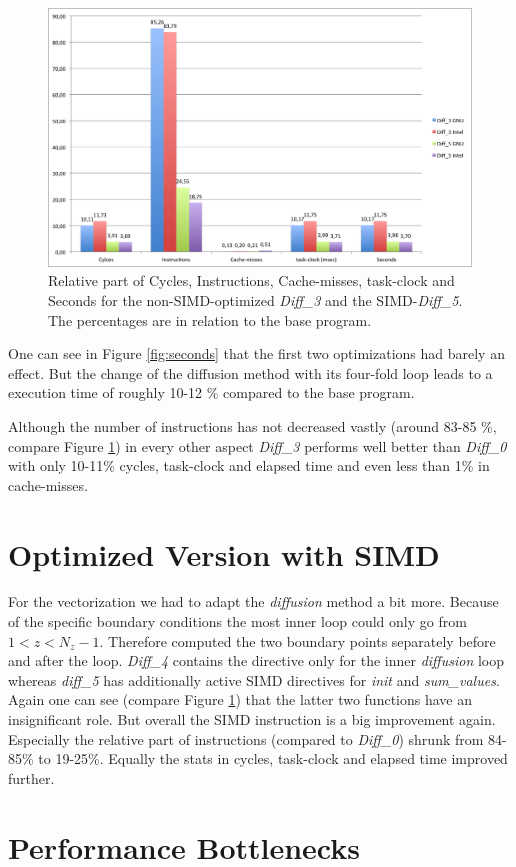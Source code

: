 \documentclass[12pt,a4paper]{article}
\begin{document}
\begin{figure}
	\centering
	\includegraphics[width=1.0\linewidth]{"Benchmark/percentage"}
	\caption{Relative part of Cycles, Instructions, Cache-misses, task-clock and Seconds for the non-SIMD-optimized \emph{Diff\_3} and the SIMD-\emph{Diff\_5}. The percentages are in relation to the base program.}
	\label{fig:percentage}
\end{figure}

One can see in Figure \ref{fig:seconds} that the first two optimizations had barely an effect. But the change of the diffusion method with its four-fold loop leads to a execution time of roughly 10-12 \% compared to the base program. 

Although the number of instructions has not decreased vastly (around 83-85 \%, compare Figure \ref{fig:percentage}) in every other aspect \emph{Diff\_3} performs well better than \emph{Diff\_0} with only 10-11\% cycles, task-clock and elapsed time and even less than 1\% in cache-misses. 

\section{Optimized Version with SIMD}

For the vectorization we had to adapt the \emph{diffusion} method a bit more. Because of the specific boundary conditions the most inner loop could only go from $ 1 < z < N_z - 1 $. Therefore computed the two boundary points separately before and after the loop. \emph{Diff\_4} contains the directive only for the inner \emph{diffusion} loop whereas \emph{diff\_5} has additionally active SIMD directives for \emph{init} and \emph{sum\_values}. Again one can see (compare Figure \ref{fig:percentage}) that the latter two functions have an insignificant role. But overall the SIMD instruction is a big improvement again. Especially the relative part of instructions (compared to \emph{Diff\_0}) shrunk from 84-85\% to 19-25\%. Equally the stats in cycles, task-clock and elapsed time improved further. 

\section{Performance Bottlenecks}
\end{document}
